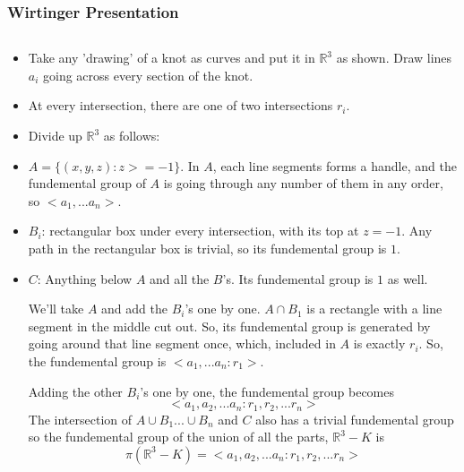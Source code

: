 \documentclass[8pt]{beamer}
\begin{document}
  \begin{frame}
    \frametitle{Wirtinger Presentation}
    \begin{columns}
      \begin{column}[T]{0.5\textwidth}
        \begin{itemize}
          \item Take any 'drawing' of a knot as curves and put it in
            $\mathbb{R}^3$ as shown. Draw lines $a_i$ going across every section
            of the knot.
          \item At every intersection, there are one of two intersections $r_i$.
          \item Divide up $\mathbb{R}^3$ as follows:
          \item $A = \{(x,y,z): z >= -1\}$. In $A$, each line segments forms a
            handle, and the fundemental group of $A$ is going through any number
            of them in any order, so $<a_1, ... a_n>$.
          \item $B_i$: rectangular box under every intersection, with its top at
            $z = -1$. Any path in the rectangular box is trivial, so its fundemental group is $1$.
          \item $C$: Anything below $A$ and all the $B$'s. Its fundemental group is $1$ as well.

            We'll take $A$ and add the $B_i$'s one by one. $A \cap B_1$ is a
            rectangle with a line segment in the middle cut out. So, its
            fundemental group is generated by going around that line segment
            once, which, included in $A$ is exactly $r_i$. So, the fundemental
            group is $<a_1, ... a_n : r_1>$.

            Adding the other $B_i$'s one by one, the fundemental group becomes
            \[<a_1, a_2, ... a_n : r_1, r_2, ... r_n>\]
            The intersection of $A \cup B_1 ... \cup B_n$ and $C$ also has a
            trivial fundemental group so the fundemental group of the union of
            all the parts, $\mathbb{R}^3- K$ is
            \[\pi(\mathbb{R}^3-K) = <a_1, a_2, ... a_n : r_1, r_2, ... r_n>\]

        \end{itemize}
      \end{column}
    \end{columns}
  \end{frame}
\end{document}
